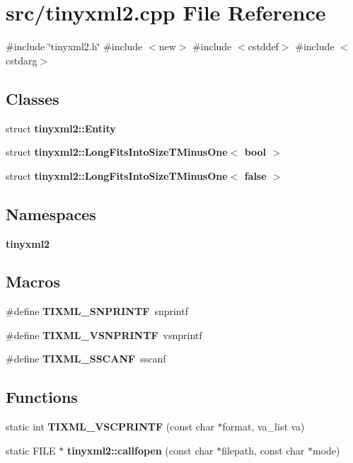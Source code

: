 \section{src/tinyxml2.cpp File Reference}
\label{tinyxml2_8cpp}
{\ttfamily \#include \char`\"{}tinyxml2.\+h\char`\"{}}\newline
{\ttfamily \#include $<$new$>$}\newline
{\ttfamily \#include $<$cstddef$>$}\newline
{\ttfamily \#include $<$cstdarg$>$}\newline
\subsection*{Classes}
\begin{DoxyCompactItemize}
\item 
struct \textbf{ tinyxml2\+::\+Entity}
\item 
struct \textbf{ tinyxml2\+::\+Long\+Fits\+Into\+Size\+T\+Minus\+One$<$ bool $>$}
\item 
struct \textbf{ tinyxml2\+::\+Long\+Fits\+Into\+Size\+T\+Minus\+One$<$ false $>$}
\end{DoxyCompactItemize}
\subsection*{Namespaces}
\begin{DoxyCompactItemize}
\item 
 \textbf{ tinyxml2}
\end{DoxyCompactItemize}
\subsection*{Macros}
\begin{DoxyCompactItemize}
\item 
\#define \textbf{ T\+I\+X\+M\+L\+\_\+\+S\+N\+P\+R\+I\+N\+TF}~snprintf
\item 
\#define \textbf{ T\+I\+X\+M\+L\+\_\+\+V\+S\+N\+P\+R\+I\+N\+TF}~vsnprintf
\item 
\#define \textbf{ T\+I\+X\+M\+L\+\_\+\+S\+S\+C\+A\+NF}~sscanf
\end{DoxyCompactItemize}
\subsection*{Functions}
\begin{DoxyCompactItemize}
\item 
static int \textbf{ T\+I\+X\+M\+L\+\_\+\+V\+S\+C\+P\+R\+I\+N\+TF} (const char $\ast$format, va\+\_\+list va)
\item 
static F\+I\+LE $\ast$ \textbf{ tinyxml2\+::callfopen} (const char $\ast$filepath, const char $\ast$mode)
\end{DoxyCompactItemize}
